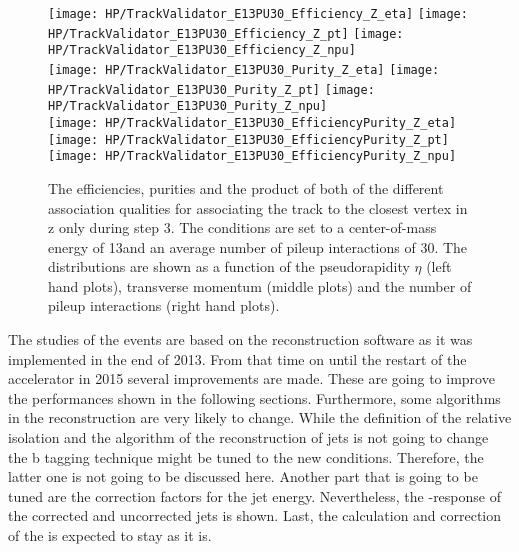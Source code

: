 \begin{figure}[Ht]
    \centering
    \texttt{[image: HP/TrackValidator\_E13PU30\_Efficiency\_Z\_eta]}
    \texttt{[image: HP/TrackValidator\_E13PU30\_Efficiency\_Z\_pt]}
    \texttt{[image: HP/TrackValidator\_E13PU30\_Efficiency\_Z\_npu]}
    \\
    \texttt{[image: HP/TrackValidator\_E13PU30\_Purity\_Z\_eta]}
    \texttt{[image: HP/TrackValidator\_E13PU30\_Purity\_Z\_pt]}
    \texttt{[image: HP/TrackValidator\_E13PU30\_Purity\_Z\_npu]}
    \\
    \texttt{[image: HP/TrackValidator\_E13PU30\_EfficiencyPurity\_Z\_eta]}
    \texttt{[image: HP/TrackValidator\_E13PU30\_EfficiencyPurity\_Z\_pt]}
    \texttt{[image: HP/TrackValidator\_E13PU30\_EfficiencyPurity\_Z\_npu]}
    \caption[Efficiencies, purities and their product of the different qualities of the association map with associating the track to the closest vertex in z only during step 3 with 13\TeV and $\left<PU\right>=30$]{The efficiencies, purities and the product of both of the different association qualities for associating the track to the closest vertex in z only during step 3. The conditions are set to a center-of-mass energy of 13\TeV and an average number of pileup interactions of 30. The distributions are shown as a function of the pseudorapidity $\eta$ (left hand plots), transverse momentum (middle plots) and the number of pileup interactions (right hand plots). \label{plot:HPUTAE13PU30ZtomumuQualZ}}
\end{figure}

The studies of the events are based on the reconstruction software as it was implemented in the end of 2013. From that time on until the restart of the accelerator in 2015 several improvements are made. These are going to improve the performances shown in the following sections. Furthermore, some algorithms in the reconstruction are very likely to change. While the definition of the relative isolation and the algorithm of the reconstruction of jets is not going to change the b tagging technique might be tuned to the new conditions. Therefore, the latter one is not going to be discussed here. Another part that is going to be tuned are the correction factors for the jet energy. Nevertheless, the \pt{}-response of the corrected and uncorrected jets is shown. Last, the calculation and correction of the \MET{} is expected to stay as it is.

